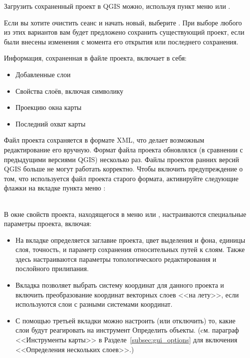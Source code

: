 Загрузить сохраненный проект в QGIS можно, используя пункт меню
 \arrow {}
или  \arrow {}.

Если вы хотите очистить сеанс и начать новый, выберите 
\arrow {}. При выборе любого
из этих вариантов вам будет предложено сохранить существующий проект, если
были внесены изменения с момента его открытия или последнего сохранения.

Информация, сохраненная в файле проекта, включает в себя:

\begin{itemize}
\item Добавленные слои
\item Свойства слоёв, включая символику
\item Проекцию окна карты
\item Последний охват карты
\end{itemize}

Файл проекта сохраняется в формате XML, что делает возможным редактирование
его вручную. Формат файла проекта обновлялся (в сравнении с
предыдущими версиями QGIS) несколько раз. Файлы проектов ранних версий
QGIS больше не могут работать корректно. Чтобы включить предупреждение о том, что
используется файл проекта старого формата, активируйте следующие флажки на вкладке
 пункта меню  \arrow {}: \\

 \\

В окне свойств проекта, находящегося в меню  или , настраиваются специальные параметры
проекта, включая:

\begin{itemize}
\item На вкладке  определяется заглавие проекта, цвет выделения
и фона, единицы слоя, точность, и параметр сохранения относительных путей
к слоям. Также здесь настраиваются параметры топологического редактирования
и послойного прилипания.
\item Вкладка  позволяет выбрать систему координат
для данного проекта и включить преобразование координат векторных слоев
<<на лету>>, если используются слои с разными системами координат.
\item С помощью третьей вкладки  можно настроить
(или отключить) то, какие слои будут реагировать на инструмент Определить
объекты. (cм. параграф <<Инструменты карты>> в Разделе~\ref{subsec:gui_options}
для включения <<Определения нескольких слоев>>.)
\end{itemize}

